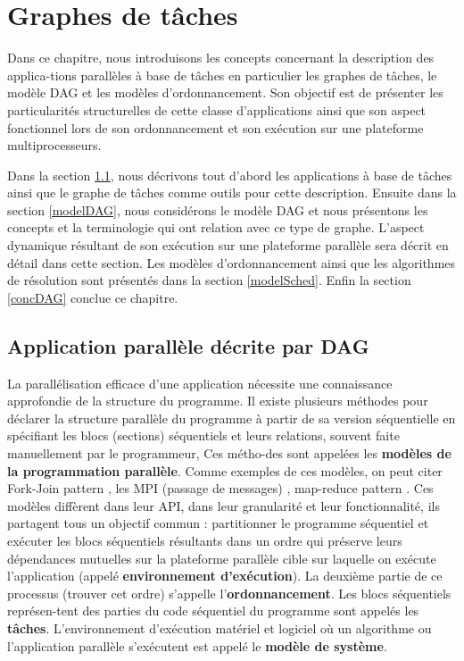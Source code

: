 ﻿\chapter{Graphes de tâches}
%
\newcommand{\RR}{\mathbb{R}}
\newcommand{\forto}{\text{\bf\ to\ }}
\newenvironment{defi}[1][Definition]{\begin{trivlist}
\item[\hskip \labelsep {\bfseries #1}]}{\end{trivlist}}
%
Dans ce chapitre, nous introduisons les concepts concernant la description des applica-tions parallèles à base de tâches en particulier les graphes de tâches, le modèle DAG et les modèles d'ordonnancement. Son objectif est de présenter les particularités structurelles de cette classe d'applications ainsi que son aspect fonctionnel lors de son ordonnancement et son exécution sur une plateforme multiprocesseurs.  

Dans la section \ref{secAPdpDAG}, nous décrivons tout d’abord les applications à base de tâches ainsi que le graphe de tâches comme outils pour cette description.
Ensuite dans la section \ref{modelDAG}, nous considérons le modèle DAG et nous présentons les concepts et la terminologie qui ont relation avec ce type de graphe. L'aspect dynamique résultant de son exécution sur une plateforme parallèle sera décrit en détail dans cette section.   
Les modèles d'ordonnancement ainsi que les algorithmes de résolution sont présentés dans la section \ref{modelSched}.
Enfin la section \ref{concDAG} conclue ce chapitre.
\section{Application parallèle décrite par DAG}\label{secAPdpDAG}
%
La parallélisation efficace d'une application nécessite une connaissance approfondie de la structure du programme. 
Il existe plusieurs méthodes pour déclarer la structure parallèle du programme à partir de sa version séquentielle en spécifiant les blocs (sections) séquentiels et leurs relations, souvent faite manuellement par le programmeur, 
Ces métho-des sont appelées les \textbf{modèles de la programmation parallèle}.
Comme exemples de ces modèles, on peut citer 
Fork-Join pattern \cite{ABB00}, les 
MPI (passage de messages) \cite{GLS99}, 
map-reduce pattern \cite{DG04}.
Ces modèles diffèrent dans leur API, dans leur granularité et leur fonctionnalité, 
ils partagent tous un objectif commun : 
partitionner le programme séquentiel et 
exécuter les blocs séquentiels résultants dans un ordre qui préserve leurs dépendances mutuelles sur la plateforme parallèle cible sur laquelle on exécute l'application (appelé \textbf{environnement d'exécution}).
La deuxième partie de ce processus (trouver cet ordre) s'appelle l'\textbf{ordonnancement}. 
Les blocs séquentiels représen-tent des parties du code séquentiel du programme sont appelés les \textbf{tâches}. 
L'environnement d'exécution matériel et logiciel où un algorithme ou l'application parallèle s'exécutent est appelé le \textbf{modèle de système}.
%
